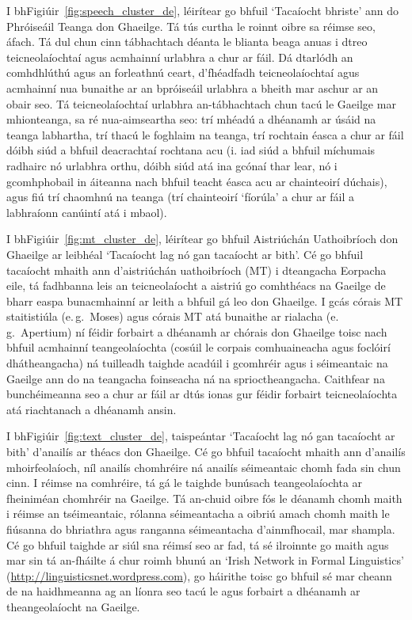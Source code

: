 \begin{multicols}{2}
I bhFigiúir~\ref{fig:speech_cluster_de}, léirítear go bhfuil `Tacaíocht bhriste’ ann do Phróiseáil Teanga don Ghaeilge. Tá tús curtha le roinnt oibre sa réimse seo, áfach. Tá dul chun cinn tábhachtach déanta le blianta beaga anuas i dtreo teicneolaíochtaí agus acmhainní urlabhra a chur ar fáil. Dá dtarlódh an comhdhlúthú agus an forleathnú ceart, d’fhéadfadh teicneolaíochtaí agus acmhainní nua bunaithe ar an bpróiseáil urlabhra a bheith mar aschur ar an obair seo. Tá teicneolaíochtaí urlabhra an-tábhachtach chun tacú le Gaeilge mar mhionteanga, sa ré nua-aimseartha seo: trí mhéadú a dhéanamh ar úsáid na teanga labhartha, trí thacú le foghlaim na teanga, trí rochtain éasca a chur ar fáil dóibh siúd a bhfuil deacrachtaí rochtana acu (i. iad siúd a bhfuil míchumais radhairc nó urlabhra orthu, dóibh siúd atá ina gcónaí thar lear, nó i gcomhphobail in áiteanna nach bhfuil teacht éasca acu ar chainteoirí dúchais), agus fiú trí chaomhnú na teanga (trí chainteoirí `fíorúla’ a chur ar fáil a labhraíonn canúintí atá i mbaol).

I bhFigiúir~\ref{fig:mt_cluster_de}, léirítear go bhfuil Aistriúchán Uathoibríoch don Ghaeilge ar leibhéal ‘Tacaíocht lag nó gan tacaíocht ar bith’. Cé go bhfuil tacaíocht mhaith ann d’aistriúchán uathoibríoch (MT) i dteangacha Eorpacha eile, tá fadhbanna leis an teicneolaíocht a aistriú go comhthéacs na Gaeilge de bharr easpa bunacmhainní ar leith a bhfuil gá leo don Ghaeilge. I gcás córais MT staitistiúla (e.\,g.~Moses) agus córais MT atá bunaithe ar rialacha (e.\,g.~Apertium) ní féidir forbairt a dhéanamh ar chórais don Ghaeilge toisc nach bhfuil acmhainní teangeolaíochta (cosúil le corpais comhuaineacha agus foclóirí dhátheangacha) ná tuilleadh taighde acadúil i gcomhréir agus i séimeantaic na Gaeilge ann do na teangacha foinseacha ná na sprioctheangacha. Caithfear na bunchéimeanna seo a chur ar fáil ar dtús ionas gur féidir forbairt teicneolaíochta atá riachtanach a dhéanamh ansin.

I bhFigiúir~\ref{fig:text_cluster_de}, taispeántar ‘Tacaíocht lag nó gan tacaíocht ar bith’ d’anailís ar théacs don Ghaeilge. Cé go bhfuil tacaíocht mhaith ann d’anailís mhoirfeolaíoch, níl anailís chomhréire ná anailís séimeantaic chomh fada sin chun cinn. I réimse na comhréire, tá gá le taighde bunúsach teangeolaíochta ar fheiniméan chomhréir na Gaeilge. Tá an-chuid oibre fós le déanamh chomh maith i réimse an tséimeantaic, rólanna séimeantacha a oibriú amach chomh maith le fiúsanna do bhriathra agus ranganna séimeantacha d’ainmfhocail, mar shampla. Cé go bhfuil taighde ar siúl sna réimsí seo ar fad, tá sé ilroinnte go maith agus mar sin tá an-fháilte á chur roimh bhunú an ‘Irish Network in Formal Linguistics' (\url{http://linguisticsnet.wordpress.com}), go háirithe toisc go bhfuil sé mar cheann de na haidhmeanna ag an líonra seo tacú le agus forbairt a dhéanamh ar theangeolaíocht na Gaeilge.


\end{multicols}
